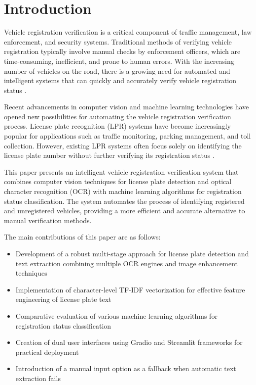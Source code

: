 \documentclass[conference]{IEEEtran}
\begin{document}
\section{Introduction}
Vehicle registration verification is a critical component of traffic management, law enforcement, and security systems. Traditional methods of verifying vehicle registration typically involve manual checks by enforcement officers, which are time-consuming, inefficient, and prone to human errors. With the increasing number of vehicles on the road, there is a growing need for automated and intelligent systems that can quickly and accurately verify vehicle registration status \cite{islam2021Blockchain}.

Recent advancements in computer vision and machine learning technologies have opened new possibilities for automating the vehicle registration verification process. License plate recognition (LPR) systems have become increasingly popular for applications such as traffic monitoring, parking management, and toll collection. However, existing LPR systems often focus solely on identifying the license plate number without further verifying its registration status \cite{kumar2023exploring}.

This paper presents an intelligent vehicle registration verification system that combines computer vision techniques for license plate detection and optical character recognition (OCR) with machine learning algorithms for registration status classification. The system automates the process of identifying registered and unregistered vehicles, providing a more efficient and accurate alternative to manual verification methods.

The main contributions of this paper are as follows:
\begin{itemize}
    \item Development of a robust multi-stage approach for license plate detection and text extraction combining multiple OCR engines and image enhancement techniques
    \item Implementation of character-level TF-IDF vectorization for effective feature engineering of license plate text
    \item Comparative evaluation of various machine learning algorithms for registration status classification
    \item Creation of dual user interfaces using Gradio and Streamlit frameworks for practical deployment
    \item Introduction of a manual input option as a fallback when automatic text extraction fails
\end{itemize}
\end{document}
